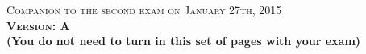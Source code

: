 \documentclass{docist}
\begin{document}
\thispagestyle{empty}

\begin{center}
  {\Large \textsc{Companion to the second exam on January 27th, 2015\\[2ex]
  \textbf{Version: A}\\[2ex]}}
  {\normalsize  \textbf{(You do not need to turn in this set of pages with your exam)}}
\end{center}



\qArchitectureKnowledge

\qArchitectureEvolution

\qPerformitis

\qArchitecturalViews

\qModueComponent

\qConcreteScenario

\qAvailabilityPingEchoHeartbeat

\qSecurityDatabase

\qSocialCalcTactic

\qThousandParsecScenario

\qGitTactic

\qArchitecturallySignificantRequirements

\qModuleTraceability

\qGeneralizationInterfaces

\qUsesIncremental

\qComponentAndConnnector

\qLoadBalancer

\qThreeTiers

\qPublishSubscribe

\qDeploymentPerformance

\qThousandParsecPersistence

\qSocialCalcBroadcastEvents

\qGitHubViews

\qOrderPadTactics


\qEtherCalcPerformance

\qEtherCalcTactic

\qEtherCalcTestability

\qEtherCalcViews


\qTransactionScript

\qActiveRecordRuby
\end{document}
